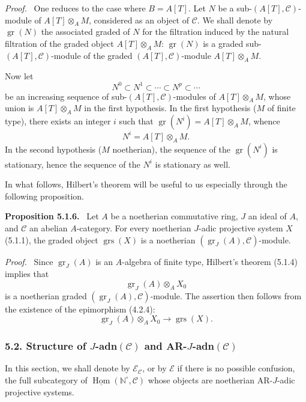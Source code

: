 \documentclass[11pt]{article}
\providecommand{\uHom}{\underline{\Hom}}
\newenvironment{statement}[1]{\par\medskip\noindent\textbf{#1.}\ }{\par\medskip}
\newenvironment{prooftext}[1][Proof]{\par\noindent\emph{#1.}\ }{\par\medskip}
\DeclareMathOperator{\Hom}{Hom}
\providecommand{\gr}{\operatorname{gr}}
\providecommand{\Hom}{\operatorname{Hom}}
\providecommand{\gr}{\operatorname{gr}}
\providecommand{\gr}{\operatorname{gr}}
\providecommand{\grs}{\operatorname{grs}}
\providecommand{\Hom}{\operatorname{Hom}}
\begin{document}
\begin{prooftext}
One reduces to the case where \(B=A[T]\). Let \(N\) be a sub-\((A[T],\mathcal C)\)-module of \(A[T]\otimes_A M\), considered as an object of \(\mathcal C\). We shall denote by \(\gr(N)\) the associated graded of \(N\) for the filtration induced by the natural filtration of the graded object \(A[T]\otimes_A M\): \(\gr(N)\) is a graded sub-\((A[T],\mathcal C)\)-module of the graded \((A[T],\mathcal C)\)-module \(A[T]\otimes_A M\).

Now let
\[
N^0\subset N^1\subset\cdots\subset N^p\subset\cdots
\]
be an increasing sequence of sub-\((A[T],\mathcal C)\)-modules of \(A[T]\otimes_A M\), whose union is \(A[T]\otimes_A M\) in the first hypothesis. In the first hypothesis (\(M\) of finite type), there exists an integer \(i\) such that \(\gr(N^i)=A[T]\otimes_A M\), whence
\[
N^i=A[T]\otimes_A M.
\]
In the second hypothesis (\(M\) noetherian), the sequence of the \(\gr(N^i)\) is stationary, hence the sequence of the \(N^i\) is stationary as well.

In what follows, Hilbert's theorem will be useful to us especially through the following proposition.
\end{prooftext}

\begin{statement}{Proposition 5.1.6}
Let \(A\) be a noetherian commutative ring, \(J\) an ideal of \(A\), and \(\mathcal C\) an abelian \(A\)-category. For every noetherian \(J\)-adic projective system \(X\) (5.1.1), the graded object \(\grs(X)\) is a noetherian \((\gr_J(A),\mathcal C)\)-module.
\end{statement}

\begin{prooftext}
Since \(\gr_J(A)\) is an \(A\)-algebra of finite type, Hilbert's theorem (5.1.4) implies that
\[
\gr_J(A)\otimes_A X_0
\]
is a noetherian graded \((\gr_J(A),\mathcal C)\)-module. The assertion then follows from the existence of the epimorphism (4.2.4):
\[
\gr_J(A)\otimes_A X_0\longrightarrow \grs(X).
\]
\end{prooftext}

\subsubsection*{5.2. Structure of \(J\)-adn\((\mathcal C)\) and AR-\(J\)-adn\((\mathcal C)\)}

In this section, we shall denote by \(\mathcal E_{\mathcal C}\), or by \(\mathcal E\) if there is no possible confusion, the full subcategory of \(\uHom(\mathbb N^\circ,\mathcal C)\) whose objects are noetherian AR-\(J\)-adic projective systems.
\end{document}

